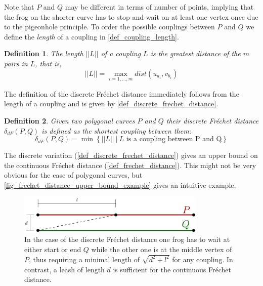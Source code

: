 \documentclass[
oneside,
fontsize=11pt
]{scrartcl}
\newtheorem{mydef}{Definition}
\begin{document}
Note that $P$ and $Q$ may be different in terms of number of points,
implying that the frog on the shorter curve 
has to stop and wait on at least one vertex once
due to the pigeonhole principle.
To order the possible couplings between $P$ and $Q$ we define the 
\textit{length} of a coupling in \autoref{def_coupling_length}. 

\begin{mydef}
  \label{def_coupling_length}
  The \textit{length} $||L||$ of a coupling $L$ is the greatest distance of the $m$ pairs in $L$, that is, 
  $$||L|| = \max_{i=1, \dots, m} dist(u_{a_i}, v_{b_i})$$
\end{mydef}

The definition of the discrete Fréchet distance immediately follows from 
the length of a coupling and is given by \autoref{def_discrete_frechet_distance}.

\begin{mydef}
  \label{def_discrete_frechet_distance}
  Given two polygonal curves $P$ and $Q$
  their discrete Fréchet distance $\delta_{dF}(P,Q)$ is defined as the shortest coupling between them: 
  $$\delta_{dF}(P,Q) = \min \left\{ ||L|| \ | \  L \text{ is a coupling between P and Q} \right\}$$
\end{mydef}

The discrete variation (\autoref{def_discrete_frechet_distance}) gives an upper bound on the continuous Fréchet distance (\autoref{def_frechet_distance}). 
This might not be very obvious for the case of polygonal curves, 
but \autoref{fig_frechet_distance_upper_bound_example} gives an intuitive example.

\begin{figure}[ht]
  \centering
  \includegraphics[width=0.8\textwidth]{images/frechet_distance/discrete-frechet-distance-upper-bound.pdf}
  \caption[Upper bound on Fréchet distance]{
    In the case of the discrete Fréchet distance 
    one frog has to wait at either start or end $Q$
    while the other one is at the middle vertex of $P$, 
    thus requiring a minimal length of $\sqrt{d^2 + l^2}$ for any coupling.
    In contrast, a leash of length $d$ is sufficient for the continuous Fréchet distance.}
  \label{fig_frechet_distance_upper_bound_example}
\end{figure}
\end{document}
